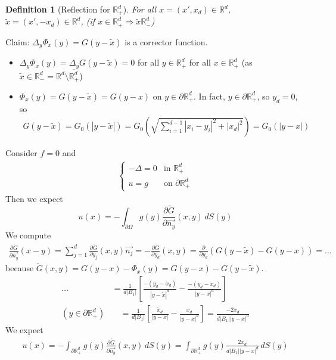 \documentclass{report}
\theoremstyle{tommy}
\newtheorem{defn}{Definition}
\begin{document}
  
  \begin{defn}[Reflection for \(\mathbb{R}_+^d\)] 
    For all \(x = (x', x_d) \in \mathbb{R}^d\), \(\tilde x = (x', -x_d) \in \mathbb{R}^d\), (if \(x \in \mathbb{R}_+^d \Rightarrow \tilde x \mathbb{R}_-^d\)) 
  \end{defn}
    
  Claim: \(\Delta_y \Phi_x(y) = G(y - \tilde x)\) is a corrector function.
  \begin{itemize}
    \item \(\Delta_y \Phi_x(y) = \Delta_y G(y-\tilde x) = 0\) for all \(y \in \mathbb{R}_+^d\) for all \(x \in \mathbb{R}_+^d\) (as \(\tilde x \in \mathbb{R}_-^d = \mathbb{R}^d \setminus \overline{\mathbb{R}_+^d}\))
    \item \(\Phi_x(y) = G(y-\tilde x) = G(y-x)\) on \(y \in \partial \mathbb{R}_+^d\). In fact, \(y \in \partial \mathbb{R}_+^d\), so \(y_d = 0\), so 
    \begin{align*}
      G(y - \tilde x) = G_0(|y-\tilde x|) = G_0\left(\sqrt{\sum_{i=1}^{d-1} |x_i - y_i|^2 +|x_d|^2}\right) = G_0(|y-x|)
    \end{align*}
  \end{itemize}
  Consider \(f = 0\) and 
  \begin{align*}
    \begin{cases}
      - \Delta = 0 &\text{in } \mathbb{R}_+^d \\ u = g & \text{on } \partial \mathbb{R}_+^d
    \end{cases}
  \end{align*}
  Then we expect \[u(x) = - \int_{\partial \Omega} g(y) \frac{\partial \tilde G}{\partial \vec{n_y}}(x,y) \, dS(y)\]
  We compute
  \begin{align*}
    \frac{\partial \tilde G}{\partial \vec{n_y}}(x-y) = \sum_{j=1}^d \frac{\partial \tilde G}{\partial y_j}(x,y) \vec{n_j} = - \frac{\partial \tilde G}{\partial y_d}(x,y) = \frac{\partial }{\partial y_d}(G(y-\tilde x) - G(y-x)) = \dots
  \end{align*}
  because \(\tilde G(x,y) = G(y-x) - \Phi_x(y) = G(y-x) - G(y-\tilde x)\). 
  \begin{align*}
    \dots &= \frac{1}{d |B_1|} \left[\frac{-(y_d - \tilde x_d)}{|y-\tilde x|^d} - \frac{-(y_d-x_d)}{|y-x|^d}\right] \\
    (y \in \partial \mathbb{R}_+^d) &\quad= \frac{1}{d|B_1|} \left[\frac{\tilde x_d}{|y-x|} - \frac{x_d}{|y-x|^d}\right]
    = \frac{- 2 x_d}{d |B_1| |y-x|^d}
  \end{align*}
  We expect
  \begin{align*}
    u(x) = - \int_{\partial \mathbb{R}_+^d} g(y) \frac{\partial \tilde G}{\partial \vec{n_y}} (x,y) \, dS(y) = \int_{\partial \mathbb{R}_+^d} g(y) \frac{2x_d}{d |B_1| |y-x|^d} \, dS(y)
  \end{align*}
  
\end{document}
